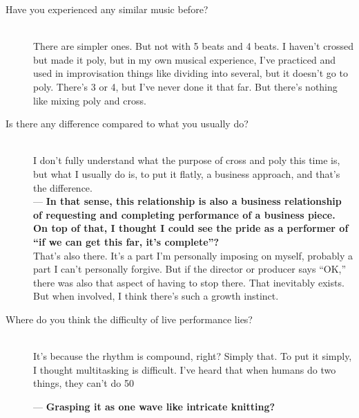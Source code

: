 \begin{description}
\item [Have you experienced any similar music before?]\mbox{}\\

There are simpler ones. But not with 5 beats and 4 beats. I haven't crossed but made it poly, but in my own musical experience, I've practiced and used in improvisation things like dividing into several, but it doesn't go to poly. There's 3 or 4, but I've never done it that far. But there's nothing like mixing poly and cross.\\

\item [Is there any difference compared to what you usually do?]\mbox{}\\

I don't fully understand what the purpose of cross and poly this time is, but what I usually do is, to put it flatly, a business approach, and that's the difference.\\

--- {\bf In that sense, this relationship is also a business relationship of requesting and completing performance of a business piece. On top of that, I thought I could see the pride as a performer of ``if we can get this far, it's complete''?}\\

That's also there. It's a part I'm personally imposing on myself, probably a part I can't personally forgive. But if the director or producer says ``OK,'' there was also that aspect of having to stop there. That inevitably exists. But when involved, I think there's such a growth instinct.\\

\item [Where do you think the difficulty of live performance lies?]\mbox{}\\

It's because the rhythm is compound, right? Simply that. To put it simply, I thought multitasking is difficult. I've heard that when humans do two things, they can't do 50%

--- {\bf Grasping it as one wave like intricate knitting?}\\


\end{description}
